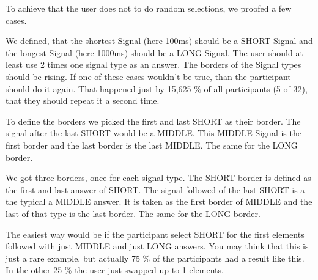 To achieve that the user does not to do random selections, we proofed a few cases.

We defined, that the shortest Signal (here 100ms) should be a SHORT Signal and the longest Signal (here 1000ms) should be a LONG Signal. 
The user should at least use 2 times one signal type as an answer. The borders of the Signal types should be rising.
If one of these cases wouldn't be true, than the participant should do it again. 
That happened just by 15,625 \% of all participants (5 of 32), that they should repeat it a second time. 

To define the borders we picked the first and last SHORT as their border. The signal after the last SHORT would be a MIDDLE. This MIDDLE Signal is the first border and the last border is the last MIDDLE. The same for the LONG border.

We got three borders, once for each signal type. The SHORT border is defined as the first and last answer of SHORT. The signal followed of the last SHORT is a the typical a MIDDLE answer. It is taken as the first border of MIDDLE and the last of that type is the last border. The same for the LONG border.

The easiest way would be if the participant select SHORT for the first elements followed with just MIDDLE and just LONG answers. 
You may think that this is just a rare example, but actually 75 \% of the participants had a result like this. In the other 25 \% the user just swapped up to 1 elements.




